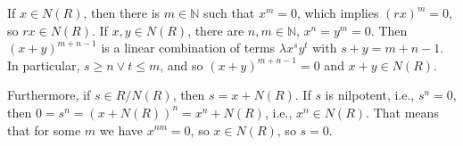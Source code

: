 If $x \in N(R)$, then there is $m \in \mathbb{N}$ such that $x^m = 0$,
which implies $(rx)^m = 0$, so $rx \in N(R)$. If $x, y \in N(R)$, there
are $n, m \in \mathbb{N}$, $x^n = y^m = 0$. Then $(x + y)^{m + n - 1}$ is
a linear combination of terms $\lambda x^sy^t$ with $s + y = m + n -  1$. In
particular, $s\geq n \vee t\leq m$, and so  $(x + y)^{m + n - 1} = 0$ and
$x + y \in N(R)$.

Furthermore, if $s \in R/N(R)$, then $s = x + N(R)$. If $s$ is nilpotent, i.e.,
$s^n = 0$, then $0 = s^n = (x + N(R))^n = x^n + N(R)$, i.e., $x^n \in N(R)$.
That means that for some $m$ we have $x^{nm} = 0$, so $x \in N(R)$, so
$s = 0$.
